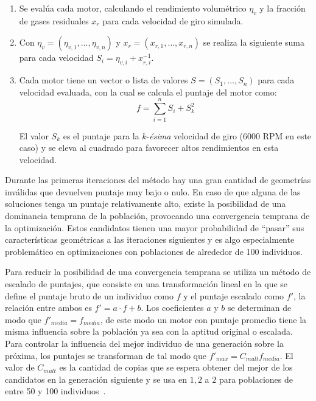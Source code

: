 \begin{enumerate}
        \item Se evalúa cada motor, calculando el rendimiento volumétrico
$\eta_{v}$ y la fracción de gases residuales $x_{r}$ para cada velocidad de giro
simulada.
        \item Con $\eta_{v} = (\eta_{v,1}, \ldots ,\eta_{v,n})$ y
$x_{r}=(x_{r,1},\ldots,x_{r,n})$ se realiza la siguiente suma para cada velocidad
$S_{i}=\eta_{v,i} + x_{r,i}^{-1}$.
        \item Cada motor tiene un vector o lista de valores
$S = (S_{1},\ldots,S_{n})$ para cada velocidad evaluada, con la cual se calcula
el puntaje del motor como:
        \begin{equation}
        f = \sum_{i=1}^{n}{S_{i}} + S_{k}^{2}
      \end{equation}

El valor $S_{k}$ es el puntaje para la $k$-\textit{ésima} velocidad de giro (6000 RPM en
este caso) y se eleva al cuadrado para favorecer altos rendimientos en esta
velocidad.
\end{enumerate}


Durante las primeras iteraciones del método hay una gran cantidad de geometrías
inválidas que devuelven puntaje muy bajo o nulo.
%
En caso de que alguna de las soluciones tenga un puntaje relativamente alto,
existe la posibilidad de una dominancia temprana de la población, provocando
una convergencia temprana de la optimización.
%
Estos candidatos tienen una mayor probabilidad de ``pasar'' sus características
geométricas a las iteraciones siguientes y es algo especialmente problemático en
optimizaciones con poblaciones de alrededor de 100 individuos.

Para reducir la posibilidad de una convergencia temprana se utiliza un método de
escalado de puntajes, que consiste en una transformación lineal en la que se
define el puntaje bruto de un individuo como $f$ y el puntaje escalado como
$f'$, la relación entre ambos es $f' = a\cdot f + b$.
%
Los coeficientes $a$ y $b$ se determinan de modo que $f'_{media}=f_{media}$, de
este modo un motor con puntaje promedio tiene la misma influencia sobre la
población ya sea con la aptitud original o escalada.
%
Para controlar la influencia del mejor individuo de una generación sobre la
próxima, los puntajes se transforman de tal modo que
$f'_{max}=C_{mult}f_{media}$.
%
El valor de $C_{mult}$ es la cantidad de copias que se espera obtener del mejor
de los candidatos en la generación siguiente y se usa en $1,2$ a $2$ para
poblaciones de entre 50 y 100 individuos~\parencite{goldberg}.

